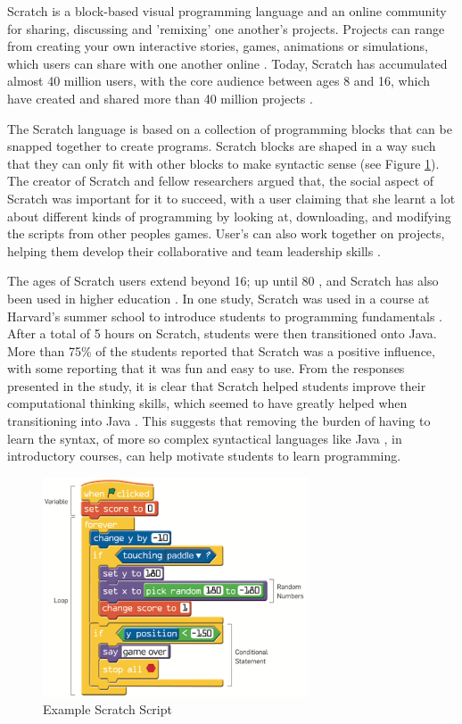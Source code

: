 \documentclass[a4paper,11.5pt]{report}
\numberwithin{figure}{section}
\numberwithin{table}{section}
\numberwithin{equation}{section}
\numberwithin{equation}{section}
\begin{document}
Scratch is a block-based visual programming language and an online community for sharing, discussing and 'remixing' one another's projects. Projects can range from creating your own interactive stories, games, animations or simulations, which users can share with one another online \citep{resnick2009}. Today, Scratch has accumulated almost 40 million users, with the core audience between ages 8 and 16, which have created and shared more than 40 million projects \citep{scratchstats}.

The Scratch language is based on a collection of programming blocks that can be snapped together to create programs. Scratch blocks are shaped in a way such that they can only fit with other blocks  to make syntactic sense (see Figure \ref{fig:Scratch-Example}). The creator of Scratch and fellow researchers argued that, the social aspect of Scratch was important for it to succeed, with a user claiming that she learnt a lot about different kinds of programming by looking at, downloading, and modifying the scripts from other peoples games. User's can also work together on projects, helping them develop their collaborative and team leadership skills \citep{resnick2009}.

The ages of Scratch users extend beyond 16; up until 80 \citep{scratchstats}, and Scratch has also been used in higher education \citep{resnick2009}. In one study, Scratch was used in a course at Harvard's summer school to introduce students to programming fundamentals \citep{malan2007}. After a total of 5 hours on Scratch, students were then transitioned onto Java. More than 75\% of the students reported that Scratch was a positive influence, with some reporting that it was fun and easy to use. From the responses presented in the study, it is clear that Scratch helped students improve their computational thinking skills, which seemed to have greatly helped when transitioning into Java \citep{malan2007}. This suggests that removing the burden of having to learn the syntax, of more so complex syntactical languages like Java \citep{malan2007}, in introductory courses, can help motivate students to learn programming.


\begin{figure}[H]
 \centering
    \includegraphics[width=0.7\textwidth]{Scratch-Example}
       \captionsetup{justification=centering}
\caption{Example Scratch Script  {\citep{scratcharticle}}}
\label{fig:Scratch-Example}
\end{figure}
\end{document}
